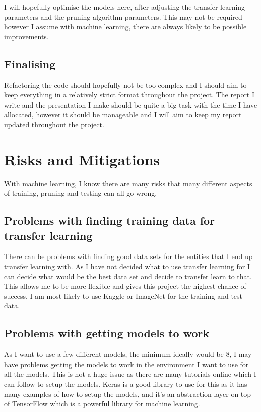 \documentclass{article}
\begin{document}
I will hopefully optimise the models here, after adjusting the transfer learning parameters and the pruning algorithm parameters. This may not be required however I assume with machine learning, there are always likely to be possible improvements.

\subsection{Finalising}

Refactoring the code should hopefully not be too complex and I should aim to keep everything in a relatively strict format throughout the project. The report I write and the presentation I make should be quite a big task with the time I have allocated, however it should be manageable and I will aim to keep my report updated throughout the project.

\pagebreak
\section{Risks and Mitigations}
With machine learning, I know there are many risks that many different aspects of training, pruning and testing can all go wrong.

\subsection{Problems with finding training data for transfer learning}
There can be problems with finding good data sets for the entities that I end up transfer learning with. 
As I have not decided what to use transfer learning for I can decide what would be the best data 
set and decide to transfer learn to that. This allows me to be more flexible and gives this project the 
highest chance of success. I am most likely to use Kaggle or ImageNet\cite{ImageNet} for the training and test data.


\subsection{Problems with getting models to work}
As I want to use a few different models, the minimum ideally would be 8, I may have 
problems getting the models to work in the environment I want to use for all the models. 
This is not a huge issue as there are many tutorials online which I can follow to setup the models.
Keras is a good library to use for this as it has many examples of how to setup the models,
and it's an abstraction layer on top of TensorFlow\cite{TensorFlow} which is a powerful library for machine learning.
\end{document}
